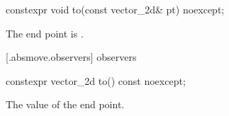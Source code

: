 \begin{itemdecl}
constexpr void to(const vector_2d& pt) noexcept;
\end{itemdecl}
\begin{itemdescr}
\pnum
\effects
The end point is .
\end{itemdescr}

 [\iotwod.absmove.observers]{ observers}

\begin{itemdecl}
constexpr vector_2d to() const noexcept;
\end{itemdecl}
\begin{itemdescr}
\pnum
\returns
The value of the end point.
\end{itemdescr}
